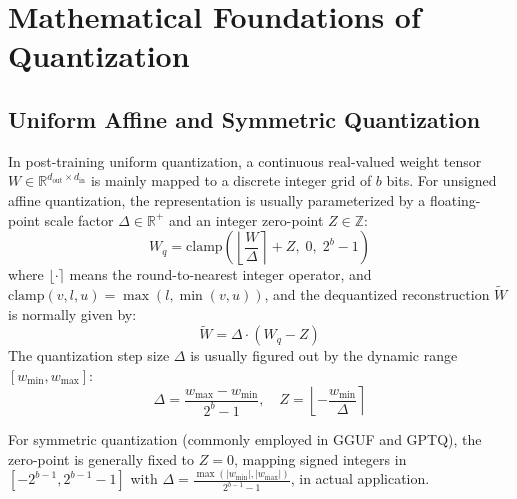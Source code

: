 \documentclass[12pt,a4paper,oneside]{report}
\begin{document}
    \chapter{Mathematical Foundations of Quantization}

    \section{Uniform Affine and Symmetric Quantization}
    In post-training uniform quantization, a continuous real-valued weight tensor $W \in \mathbb{R}^{d_{\text{out}} \times d_{\text{in}}}$ is mainly mapped to a discrete integer grid of $b$ bits. For unsigned affine quantization, the representation is usually parameterized by a floating-point scale factor $\Delta \in \mathbb{R}^+$ and an integer zero-point $Z \in \mathbb{Z}$:
    \begin{equation}
        W_q = \text{clamp}\left( \left\lfloor \frac{W}{\Delta} \right\rceil + Z, \; 0, \; 2^b - 1 \right)
    \end{equation}
    where $\lfloor \cdot \rceil$ means the round-to-nearest integer operator, and $\text{clamp}(v, l, u) = \max(l, \min(v, u))$, and the dequantized reconstruction $\widetilde{W}$ is normally given by:
    \begin{equation}
        \widetilde{W} = \Delta \cdot (W_q - Z)
    \end{equation}
    The quantization step size $\Delta$ is usually figured out by the dynamic range $[w_{\min}, w_{\max}]$:
    \begin{equation}
        \Delta = \frac{w_{\max} - w_{\min}}{2^b - 1}, \quad Z = \left\lfloor -\frac{w_{\min}}{\Delta} \right\rceil
    \end{equation}

    For symmetric quantization (commonly employed in GGUF and GPTQ), the zero-point is generally fixed to $Z = 0$, mapping signed integers in $[-2^{b-1}, 2^{b-1}-1]$ with $\Delta = \frac{\max(|w_{\min}|, |w_{\max}|)}{2^{b-1}-1}$, in actual application.
\end{document}
